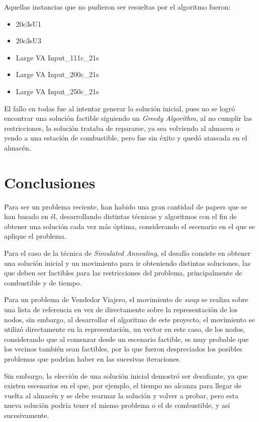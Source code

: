 \documentclass[letter, 10pt]{article}
\begin{document}
\begin{itemize}
Aquellas instancias que no pudieron ser resueltas por el algoritmo fueron:
\begin{itemize}
\item 20c3sU1
\item 20c3sU3
\item Large VA Input\_111c\_21s
\item Large VA Input\_200c\_21s
\item Large VA Input\_250c\_21s
\end{itemize}
		
El fallo en todas fue al intentar generar la solución inicial, pues no se logró encontrar una solución factible siguiendo un \textit{Greedy Algorithm}, al no cumplir las restricciones, la solución trataba de repararse, ya sea volviendo al almacen o yendo a una estación de combustible, pero fue sin éxito y quedó atascada en el almacén.

\end{itemize}

\section{Conclusiones}
Para ser un problema reciente, han habido una gran cantidad de papers que se han basado en él, desarrollando distintas técnicas y algoritmos con el fin de obtener una solución cada vez más óptima, considerando el escenario en el que se aplique el problema.

Para el caso de la técnica de \textit{Simulated Annealing}, el desafío consiste en obtener una solución inicial y un movimiento para ir obteniendo distintas soluciones, las que deben ser factibles para las restricciones del problema, principalmente de combustible y de tiempo.

Para un problema de Vendedor Viajero, el movimiento de \textit{swap} se realiza sobre una lista de referencia en vez de directamente sobre la representación de los nodos, sin embargo, al desarrollar el algoritmo de este proyecto, el movimiento se utilizó directamente en la representación, un vector en este caso, de los nodos, considerando que al comenzar desde un escenario factible, es muy probable que los vecinos también sean factibles, por lo que fueron despreciados los posibles problemas que podrían haber en las sucesivas iteraciones.

Sin embargo, la elección de una solución inicial demostró ser desafiante, ya que existen escenarios en el que, por ejemplo, el tiempo no alcanza para llegar de vuelta al almacén y se debe rearmar la solución y volver a probar, pero esta nueva solución podría tener el mismo problema o el de combustible, y así sucesivamente.
\end{document}
